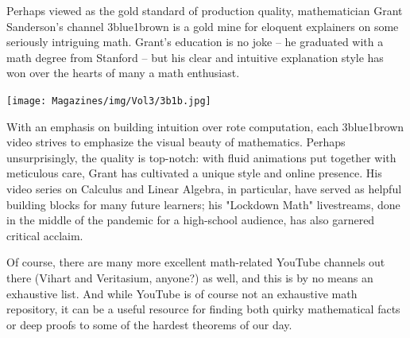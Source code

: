 \documentclass{article}
\begin{document}
Perhaps viewed as the gold standard of production quality, mathematician Grant Sanderson's channel 3blue1brown is a gold mine for eloquent explainers on some seriously intriguing math. Grant's education is no joke -- he graduated with a math degree from Stanford -- but his clear and intuitive explanation style has won over the hearts of many a math enthusiast. 
\begin{center}
\texttt{[image: Magazines/img/Vol3/3b1b.jpg]}
\end{center}
With an emphasis on building intuition over rote computation, each 3blue1brown video strives to emphasize the visual beauty of mathematics. Perhaps unsurprisingly, the quality is top-notch: with fluid animations put together with meticulous care, Grant has cultivated a unique style and online presence. His video series on Calculus and Linear Algebra, in particular, have served as helpful building blocks for many future learners; his "Lockdown Math" livestreams, done in the middle of the pandemic for a high-school audience, has also garnered critical acclaim. 

Of course, there are many more excellent math-related YouTube channels out there (Vihart and Veritasium, anyone?) as well, and this is by no means an exhaustive list. And while YouTube is of course not an exhaustive math repository, it can be a useful resource for finding both quirky mathematical facts or deep proofs to some of the hardest theorems of our day.
\end{document}
